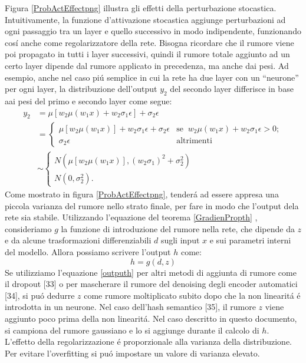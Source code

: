 \documentclass[a4paper,10pt]{article}
\begin{document}
 Figura \ref{ProbActEffectpng} illustra gli effetti della perturbazione stocastica. Intuitivamente, la funzione d'attivazione stocastica aggiunge perturbazioni ad ogni passaggio tra un layer e quello successivo in modo indipendente, funzionando cos\'i anche come regolarizzatore della rete. Bisogna ricordare che il rumore viene poi propagato in tutti i layer successivi, quindi il rumore totale aggiunto ad un certo layer dipende dal rumore applicato in precedenza, ma anche dai pesi. Ad esempio, anche nel caso pi\'u semplice in cui la rete ha due layer con un ``neurone'' per ogni layer, la distribuzione dell'output $y_2$ del secondo layer differisce in base aai pesi del primo e secondo layer come segue:
 \begin{align}
  y_2 &= \mu \left[ w_2\mu\left(w_1 x\right) + w_2\sigma_1\epsilon\right] + \sigma_2\epsilon\\
  &= 
  \begin{cases}
   \mu\left[ w_2\mu\left(w_1 x\right)\right] + w_2\sigma_1\epsilon + \sigma_2\epsilon & \mbox{se} \;\; w_2\mu\left(w_1 x\right) + w_2\sigma_1\epsilon>0;\\
   \sigma_2\epsilon & \mbox{altrimenti}
  \end{cases} \\
  &\sim 
  \begin{cases}
   N\left(\mu\left[w_2\mu\left(w_1 x\right)\right],\left(w_2\sigma_1\right)^2 + \sigma_2^2\right)\\
   N\left(0,\sigma_2^2\right).
  \end{cases}
 \end{align}
 Come mostrato in figura \ref{ProbActEffectpng}, tender\'a ad essere appresa una piccola varianza del rumore nello strato finale, per fare in modo che l'output dela rete sia stabile. Utilizzando l'equazione del teorema \ref{GradienPropth} , consideriamo $g$ la funzione di introduzione del rumore nella rete, che dipende da $z$ e da alcune trasformazioni differenziabili $d$ sugli input $x$ e sui parametri interni del modello. Allora possiamo scrivere l'output $h$ come:
 \begin{equation}
  h = g(d,z) \label{outputh}
 \end{equation}
 Se utilizziamo l'equazione \ref{outputh} per altri metodi di aggiunta di rumore come il dropout [33] o per mascherare il rumore del denoising degli encoder automatici [34], si pu\'o dedurre $z$  come rumore moltiplicato subito dopo che la non linearit\'a \'e introdotta in un neurone. Nel caso dell'hash semantico [35], il rumore $z$ viene aggiunto poco prima della non linearit\'a. Nel caso descritto in questo documento, si campiona del rumore gaussiano e lo si aggiunge durante il calcolo di $h$. L'effetto della regolarizzazione \'e proporzionale alla varianza della distribuzione. Per evitare l'overfitting si pu\'o impostare un valore di varianza elevato.
 
\end{document}
